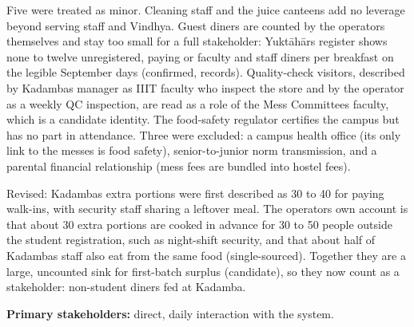 \documentclass[
  10pt,
  table]{article}
\newcounter{none} %
\begin{document}
Five were treated as minor. Cleaning staff and the juice canteens add no leverage beyond serving staff and Vindhya. Guest diners are counted by the operators themselves and stay too small for a full stakeholder: Yuktāhār\textquotesingle s register shows none to twelve unregistered, paying or faculty and staff diners per breakfast on the legible September days (confirmed, records). Quality-check visitors, described by Kadamba\textquotesingle s manager as IIIT faculty who inspect the store and by the operator as a weekly QC inspection, are read as a role of the Mess Committee\textquotesingle s faculty, which is a candidate identity. The food-safety regulator certifies the campus but has no part in attendance. Three were excluded: a campus health office (its only link to the messes is food safety), senior-to-junior norm transmission, and a parental financial relationship (mess fees are bundled into hostel fees).

Revised: Kadamba\textquotesingle s extra portions were first described as 30 to 40 for paying walk-ins, with security staff sharing a leftover meal. The operator\textquotesingle s own account is that about 30 extra portions are cooked in advance for 30 to 50 people outside the student registration, such as night-shift security, and that about half of Kadamba\textquotesingle s staff also eat from the same food (single-sourced). Together they are a large, uncounted sink for first-batch surplus (candidate), so they now count as a stakeholder: non-student diners fed at Kadamba.

\textbf{Primary stakeholders:} direct, daily interaction with the system.
\end{document}
